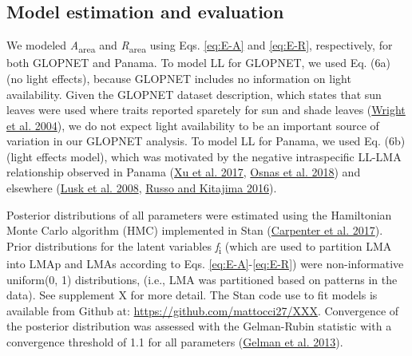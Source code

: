 \documentclass[
  12pt,
]{article}
\begin{document}
\hypertarget{model-estimation-and-evaluation}{%
\subsection{Model estimation and evaluation}\label{model-estimation-and-evaluation}}

We modeled \emph{A}\textsubscript{area} and \emph{R}\textsubscript{area} using Eqs. \eqref{eq:E-A} and \eqref{eq:E-R}, respectively, for both GLOPNET and Panama.
To model LL for GLOPNET, we used Eq. (6a) (no light effects), because GLOPNET includes no information on light availability.
Given the GLOPNET dataset description, which states that sun leaves were used where traits reported sparetely for sun and shade leaves (\protect\hyperlink{ref-Wright2004a}{Wright et al. 2004}), we do not expect light availability to be an important source of variation in our GLOPNET analysis.
To model LL for Panama, we used Eq. (6b) (light effects model), which was motivated by the negative intraspecific LL-LMA relationship observed in Panama (\protect\hyperlink{ref-Xu2017}{Xu et al. 2017}, \protect\hyperlink{ref-Osnas2018}{Osnas et al. 2018}) and elsewhere (\protect\hyperlink{ref-Lusk2008}{Lusk et al. 2008}, \protect\hyperlink{ref-Russo2016}{Russo and Kitajima 2016}).

Posterior distributions of all parameters were estimated using the Hamiltonian Monte Carlo algorithm (HMC) implemented in Stan (\protect\hyperlink{ref-Carpenter2017}{Carpenter et al. 2017}).
Prior distributions for the latent variables \emph{f}\textsubscript{i} (which are used to partition LMA into LMAp and LMAs according to Eqs. \eqref{eq:E-A}-\eqref{eq:E-R}) were non-informative uniform(0, 1) distributions, (i.e., LMA was partitioned based on patterns in the data).
See supplement X for more detail.
The Stan code use to fit models is available from Github at: \href{https://github.com/mattocci27/LMApLMAs}{https://github.com/mattocci27/XXX}.
Convergence of the posterior distribution was assessed with the Gelman-Rubin statistic with a convergence threshold of 1.1 for all parameters (\protect\hyperlink{ref-Gelman2013}{Gelman et al. 2013}).
\end{document}
